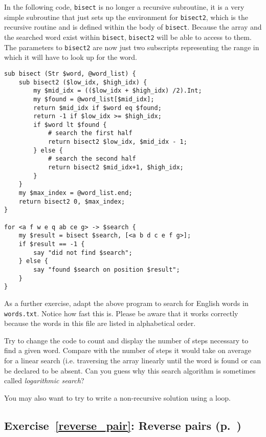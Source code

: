 {In the following code, {\tt bisect} is no longer a 
recursive subroutine, it is a very simple subroutine 
that just sets up the environment for {\tt bisect2},
which is the recursive routine and is defined within 
the body of {\tt bisect}. Because the array and the 
searched word exist within {\tt bisect}, {\tt bisect2} 
will be able to access to them. The parameters to 
{\tt bisect2} are now just two subscripts representing 
the range in which it will have to look up for the 
word.

\begin{verbatim}
sub bisect (Str $word, @word_list) {
    sub bisect2 ($low_idx, $high_idx) {
        my $mid_idx = (($low_idx + $high_idx) /2).Int;
        my $found = @word_list[$mid_idx];
        return $mid_idx if $word eq $found;
        return -1 if $low_idx >= $high_idx;
        if $word lt $found {
            # search the first half
            return bisect2 $low_idx, $mid_idx - 1;
        } else {
            # search the second half
            return bisect2 $mid_idx+1, $high_idx;
        }
    }
    my $max_index = @word_list.end;
    return bisect2 0, $max_index;
}

for <a f w e q ab ce g> -> $search { 
    my $result = bisect $search, [<a b d c e f g>];
    if $result == -1 {
        say "did not find $search";
    } else {
        say "found $search on position $result";
    }
}
\end{verbatim}

As a further exercise, adapt the above program to 
search for English words in {\tt words.txt}. Notice 
how fast this is. Please 
be aware that it works correctly because the words 
in this file are listed in alphabetical order.

Try to change 
the code to count and display the number of steps 
necessary to find a given word. Compare with the number 
of steps it would take on average for a linear search 
(i.e. traversing the array linearly until the word 
is found or can be declared to be absent. Can you 
guess why this search algorithm is sometimes 
called \emph{logarithmic search}?

You may also want to try to write a non-recursive solution 
using a loop.


\subsection{Exercise~\ref{reverse_pair}: Reverse pairs (p.~\pageref{reverse_pair})}
\label{sol_reverse_pair}

}
